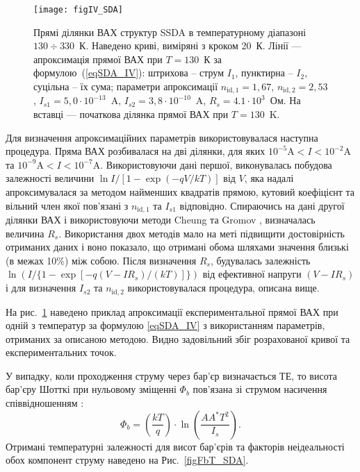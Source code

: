 \begin{figure}
\center
\texttt{[image: figIV\_SDA]}
\caption{\label{figIV_SDA}
Прямі  ділянки ВАХ структур SSDA в температурному діапазоні $130\div330$~К.
Наведено криві, виміряні з кроком 20~К.
Лінії --- апроксимація прямої ВАХ при $T=130$~К за формулою~(\ref{eqSDA_IV}):
штрихова -- струм $I_1$, пунктирна -- $I_2$,
суцільна -- їх сума;
параметри апроксимації $n_{\mathrm{id},1}=1,67$,
$n_{\mathrm{id},2}=2,53$,
$I_{s1}=5,0\cdot10^{-13}$~A,
$I_{s2}=3,8\cdot10^{-10}$~A, $R_{s}=4.1\cdot10^3$~Ом.
На вставці --- початкова ділянка прямої ВАХ при $T=130$~K.
}%
\end{figure}

Для визначення апроксимаційних параметрів використовувалася наступна процедура.
Пряма ВАХ розбивалася на дві ділянки,
для яких $10^{-5}\mbox{A}<I<10^{-2}\mbox{A}$ та
$10^{-9}\mbox{A}<I<10^{-7}\mbox{A}$.
Використовуючи дані першої, виконувалась побудова залежності величини $\ln{{I}/{\left[1-\exp\left(-qV/kT\right)\right]}}$ від $V$, яка надалі
апроксимувалася за методом найменших квадратів прямою,
кутовий коефіцієнт та вільний член якої пов'язані з $n_{\mathrm{id},1}$ та $I_{s1}$ відповідно.
Спираючись на дані другої ділянки ВАХ і використовуючи методи Cheung \cite{Cheung} та Gromov \cite{Gromov}, визначалась величина $R_s$.
Використання двох методів мало на меті підвищити достовірність отриманих даних і воно показало, що отримані обома шляхами значення близькі (в межах 10\%) між собою.
Після визначення $R_s$, будувалась залежність $\ln (I /\{1 - \exp[ -q (V - IR_s) / (kT ) ]\})$ від
ефективної напруги $(V-IR_s)$ і для визначення $I_{s2}$ та $n_{\mathrm{id},2}$ використовувалася процедура, описана вище.

На рис.~\ref{figIV_SDA} наведено приклад апроксимації експериментальної прямої ВАХ при одній з температур за формулою \eqref{eqSDA_IV} з використанням параметрів,
отриманих за описаною методою.
Видно задовільний збіг розрахованої кривої та експериментальних точок.

У випадку, коли проходження струму через бар'єр визначається ТЕ, то висота бар'єру Шотткі при
нульовому зміщенні $\Phi_b$ пов'язана зі струмом насичення співвідношенням \cite{Rhoderick1988}:
\begin{equation}
\label{eqFb:TE}
\Phi_b=\left(\frac{kT}{q}\right)\cdot\ln\left(\frac{AA^*T^2}{I_s}\right).
\end{equation}
Отримані температурні залежності для висот бар'єрів та факторів неідеальності обох компонент струму наведено на Рис.~\ref{figFbT_SDA}.

